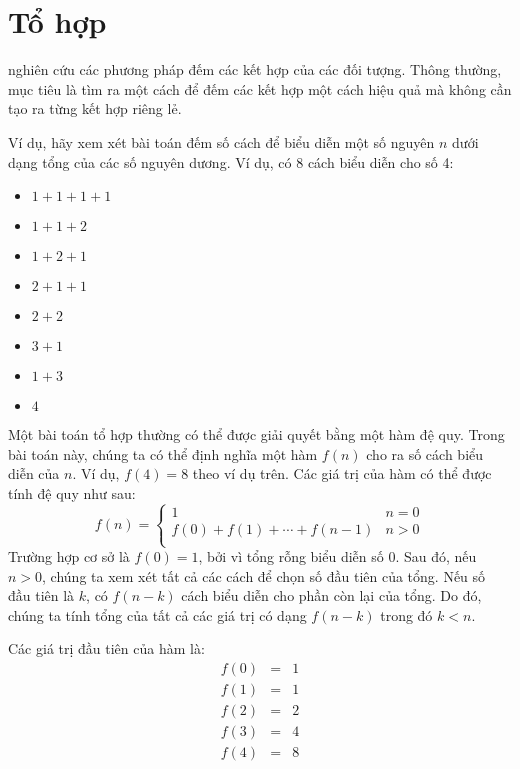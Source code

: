 \chapter{Tổ hợp}


 nghiên cứu các phương pháp đếm
các kết hợp của các đối tượng.
Thông thường, mục tiêu là tìm ra một cách để
đếm các kết hợp một cách hiệu quả
mà không cần tạo ra từng kết hợp riêng lẻ.

Ví dụ, hãy xem xét bài toán
đếm số cách để
biểu diễn một số nguyên $n$ dưới dạng tổng của các số nguyên dương.
Ví dụ, có 8 cách biểu diễn
cho số 4:
\begin{multicols}{2}
\begin{itemize}
\item $1+1+1+1$
\item $1+1+2$
\item $1+2+1$
\item $2+1+1$
\item $2+2$
\item $3+1$
\item $1+3$
\item $4$
\end{itemize}
\end{multicols}

Một bài toán tổ hợp thường có thể được giải quyết
bằng một hàm đệ quy.
Trong bài toán này, chúng ta có thể định nghĩa một hàm $f(n)$
cho ra số cách biểu diễn của $n$.
Ví dụ, $f(4)=8$ theo ví dụ trên.
Các giá trị của hàm
có thể được tính đệ quy như sau:
\begin{equation*}
    f(n) = \begin{cases}
               1               & n = 0\\
               f(0)+f(1)+\cdots+f(n-1) & n > 0\\
           \end{cases}
\end{equation*}
Trường hợp cơ sở là $f(0)=1$,
bởi vì tổng rỗng biểu diễn số 0.
Sau đó, nếu $n>0$, chúng ta xem xét tất cả các cách để
chọn số đầu tiên của tổng.
Nếu số đầu tiên là $k$,
có $f(n-k)$ cách biểu diễn
cho phần còn lại của tổng.
Do đó, chúng ta tính tổng của tất cả các giá trị
có dạng $f(n-k)$ trong đó $k<n$.

Các giá trị đầu tiên của hàm là:
\[
\begin{array}{lcl}
f(0) & = & 1 \\
f(1) & = & 1 \\
f(2) & = & 2 \\
f(3) & = & 4 \\
f(4) & = & 8 \\
\end{array}
\]


